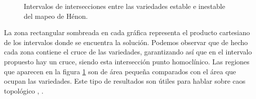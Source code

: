 \begin{figure}[htbp]
\vspace{0mm}
\caption{Intervalos de intersecciones entre las variedades estable e inestable del mapeo de Hénon.} \label{matriz_cortes}
\end{figure}










La zona rectangular sombreada en cada gráfica representa el producto cartesiano de los intervalos donde se encuentra la solución. Podemos observar que de hecho cada zona contiene el cruce de las variedades, garantizando así que en el intervalo propuesto hay un cruce, siendo esta intersección punto homoclínico. Las regiones que aparecen en la figura \ref{matriz_cortes} son de área pequeña comparados con el área que ocupan las variedades. Este tipo de resultados son útiles para hablar sobre caos topológico \cite{devaney}, \cite{gerald}.\\

